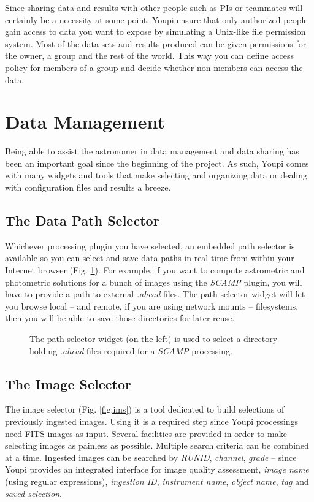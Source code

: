 \documentclass[11pt,twoside]{article}  %
\begin{document}
Since sharing data and results with other people such as PIs or teammates will certainly 
be a necessity at some point, Youpi ensure that only authorized people gain access to data 
you want to expose by simulating a Unix-like file permission system. Most of the data sets 
and results produced can be given permissions for the owner, a group and the rest of the 
world. This way you can define access policy for members of a group and decide whether non 
members can access the data.

\section{Data Management}

Being able to assist the astronomer in data management and data sharing has been an important 
goal since the beginning of the project. As such, Youpi comes with many widgets and tools that 
make selecting and organizing data or dealing with configuration files and results a breeze.

\subsection{The Data Path Selector}

Whichever processing plugin you have selected, an embedded path selector is available so you 
can select and save data paths in real time from within your Internet browser (Fig. \ref{fig:browser}).
For example, if you want to compute astrometric and photometric solutions for a bunch of images 
using the \emph{SCAMP} plugin, you will have to provide a path to external \emph{.ahead} files.
The path selector widget will let you browse local -- and remote, if you are using network mounts -- 
filesystems, then you will be able to save those directories for later reuse.

\begin{figure}[h]
\caption{The path selector widget (on the left) is used to select a directory holding \emph{.ahead} 
files required for a \emph{SCAMP} processing.}\label{fig:browser}
\end{figure}

\subsection{The Image Selector}\label{sec:ims}

The image selector (Fig. \ref{fig:ims}) is a tool dedicated to build selections of previously 
ingested images.  Using it is a required step since Youpi processings need FITS images as input. 
Several facilities are provided in order to make selecting images as painless as possible. 
Multiple search criteria can be combined at a time. Ingested images can be searched by \emph{RUNID}, 
\emph{channel}, \emph{grade} -- since Youpi provides an integrated interface for image 
quality assessment, \emph{image name} (using regular expressions), \emph{ingestion ID}, 
\emph{instrument name}, \emph{object name}, \emph{tag} and \emph{saved selection}.
\end{document}
